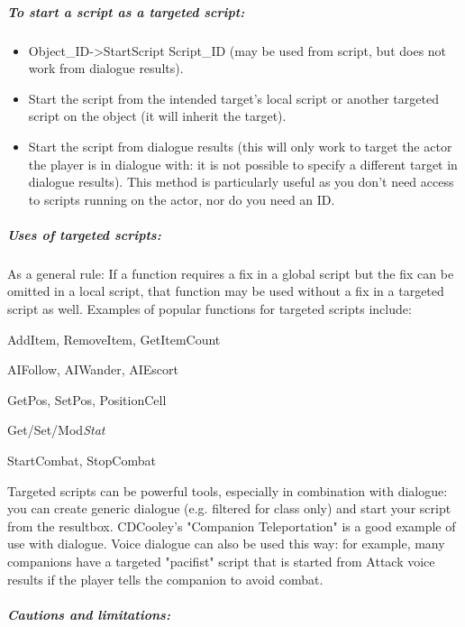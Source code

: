 \hypertarget{to-start-a-script-as-a-targeted-script}{%
\subparagraph{To start a script as a targeted
script:}\label{to-start-a-script-as-a-targeted-script}}

\begin{itemize}
\item
  Object\_ID-\textgreater StartScript Script\_ID (may be used from
  script, but does not work from dialogue results).
\item
  Start the script from the intended target's local script or another
  targeted script on the object (it will inherit the target).
\item
  Start the script from dialogue results (this will only work to target
  the actor the player is in dialogue with: it is not possible to
  specify a different target in dialogue results). This method is
  particularly useful as you don't need access to scripts running on the
  actor, nor do you need an ID.
\end{itemize}

\hypertarget{uses-of-targeted-scripts}{%
\subparagraph{Uses of targeted
scripts:}\label{uses-of-targeted-scripts}}

As a general rule: If a function requires a fix in a global script but
the fix can be omitted in a local script, that function may be used
without a fix in a targeted script as well. Examples of popular
functions for targeted scripts include:

AddItem, RemoveItem, GetItemCount

AIFollow, AIWander, AIEscort

GetPos, SetPos, PositionCell

Get/Set/Mod\emph{Stat}

StartCombat, StopCombat

Targeted scripts can be powerful tools, especially in combination with
dialogue: you can create generic dialogue (e.g. filtered for class only)
and start your script from the resultbox. CDCooley's "Companion
Teleportation" is a good example of use with dialogue. Voice dialogue
can also be used this way: for example, many companions have a targeted
"pacifist" script that is started from Attack voice results if the
player tells the companion to avoid combat.

\hypertarget{cautions-and-limitations}{%
\subparagraph{Cautions and
limitations:}\label{cautions-and-limitations}}

